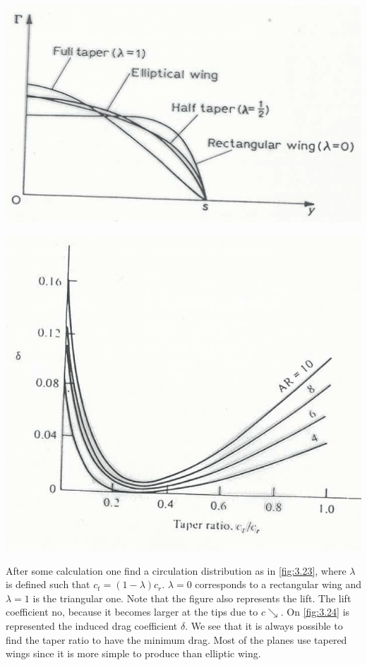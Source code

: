 \documentclass[british,french,11pt, a4paper, openany]{article}
\begin{document}
\begin{center}
	\begin{minipage}{0.4\textwidth}
		\includegraphics[scale=0.15]{ch3/23}
		\label{fig:3.23}
	\end{minipage}
	\begin{minipage}{0.22\textwidth}
		\includegraphics[scale=0.12]{ch3/24}
		\label{fig:3.24}
	\end{minipage}
\end{center}

After some calculation one find a circulation distribution as in \autoref{fig:3.23}, where $\lambda$ is defined such that $c_t = (1- \lambda) c_r$. $\lambda = 0$ corresponds to a rectangular wing and $\lambda = 1$ is the triangular one. Note that the figure also represents the lift. The lift coefficient no, because it becomes larger at the tips due to $c\searrow$. On \autoref{fig:3.24} is represented the induced drag coefficient $\delta$. We see that it is always possible to find the taper ratio to have the minimum drag. Most of the planes use tapered wings since it is more simple to produce than elliptic wing.
\end{document}
